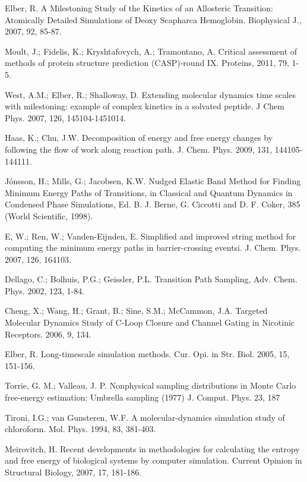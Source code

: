 \documentclass[12pt]{article}
\begin{document}
\begin{thebibliography}{99}

Elber, R. A Milestoning Study of the Kinetics of an Allosteric Transition: Atomically Detailed Simulations of Deoxy Scapharca
Hemoglobin. Biophysical J., 2007, 92, 85-87.

Moult, J.; Fidelis, K.; Kryshtafovych, A.; Tramontano, A. Critical assessment of methods of protein structure prediction (CASP)-round IX.
Proteins, 2011, 79, 1-5.

West, A.M.; Elber, R.; Shalloway, D. Extending molecular dynamics time scales with milestoning: example of complex kinetics
in a solvated peptide. J Chem Phys. 2007, 126, 145104-1451014.

Haas, K.; Chu, J.W. Decomposition of energy and free energy changes by following the flow of work along reaction path.
J. Chem. Phys. 2009, 131, 144105-144111.

Jónsson, H.; Mills, G.; Jacobsen, K.W. Nudged Elastic Band Method for Finding Minimum Energy Paths of Transitions,
in Classical and Quantum Dynamics in Condensed Phase Simulations, Ed. B. J. Berne, G. Ciccotti and D. F.
Coker, 385 (World Scientific, 1998).

E, W.; Ren, W.; Vanden-Eijnden, E. Simplified and improved string method for computing the minimum energy paths in
barrier-crossing eventsi. J. Chem. Phys. 2007, 126, 164103.

Dellago, C.; Bolhuis, P.G.; Geissler, P.L. Transition Path Sampling, Adv. Chem. Phys. 2002, 123, 1-84.

Cheng, X.; Wang, H.; Grant, B.; Sine, S.M.; McCammon, J.A. Targeted Molecular Dynamics Study of C-Loop Closure
and Channel Gating in Nicotinic Receptors. 2006, 9, 134.

Elber, R. Long-timescale simulation methods. Cur. Opi. in Str. Biol. 2005, 15, 151-156.

Torrie, G. M.; Valleau, J. P. Nonphysical sampling distributions in Monte Carlo free-energy estimation: Umbrella sampling
(1977) J. Comput. Phys. 23, 187

Tironi, I.G.; van Gunsteren, W.F. A molecular-dynamics simulation study of chloroform. Mol. Phys. 1994, 83, 381-403.

Meirovitch, H. Recent developments in methodologies for calculating the entropy and free energy of biological systems by computer simulation.
Current Opinion in Structural Biology, 2007, 17, 181-186.



\end{thebibliography}
\end{document}
